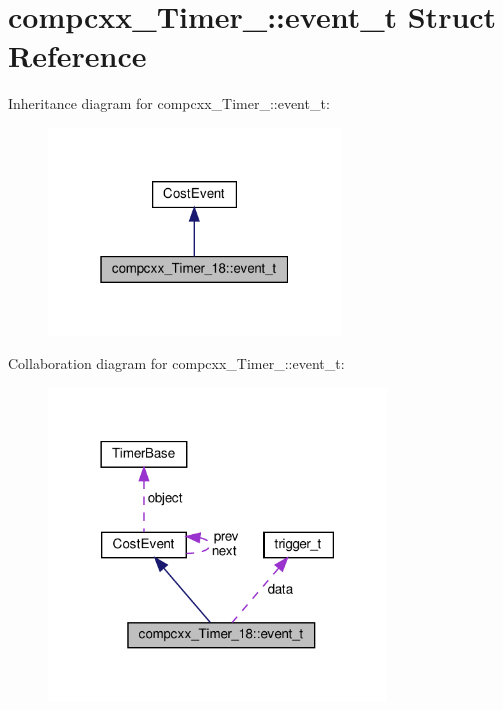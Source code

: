\hypertarget{structcompcxx__Timer__18_1_1event__t}{}\section{compcxx\+\_\+\+Timer\+\_\+:\+:event\+\_\+t Struct Reference}
\label{structcompcxx__Timer__18_1_1event__t}


Inheritance diagram for compcxx\+\_\+\+Timer\+\_\+:\+:event\+\_\+t\+:\nopagebreak
\begin{figure}[H]
\begin{center}
\leavevmode
\includegraphics[width=220pt]{structcompcxx__Timer__18_1_1event__t__inherit__graph}
\end{center}
\end{figure}


Collaboration diagram for compcxx\+\_\+\+Timer\+\_\+:\+:event\+\_\+t\+:\nopagebreak
\begin{figure}[H]
\begin{center}
\leavevmode
\includegraphics[width=254pt]{structcompcxx__Timer__18_1_1event__t__coll__graph}
\end{center}
\end{figure}
